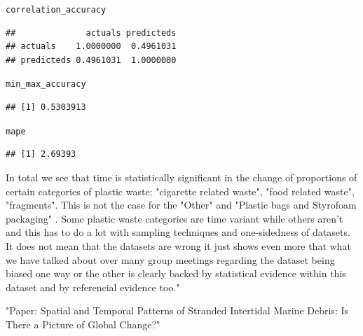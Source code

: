 \documentclass[10pt]{article}\usepackage[]{graphicx}\usepackage[]{color}
\makeatletter
\newcommand{\hlstd}[1]{\textcolor[rgb]{0.345,0.345,0.345}{#1}}%
\newenvironment{kframe}{%
 \def\at@end@of@kframe{}%
 \ifinner\ifhmode%
  \def\at@end@of@kframe{\end{minipage}}%
  \begin{minipage}{\columnwidth}%
 \fi\fi%
 \def\FrameCommand##1{\hskip\@totalleftmargin \hskip-\fboxsep
 \colorbox{shadecolor}{##1}\hskip-\fboxsep
     \hskip-\linewidth \hskip-\@totalleftmargin \hskip\columnwidth}%
 \MakeFramed {\advance\hsize-\width
   \@totalleftmargin\z@ \linewidth\hsize
   \@setminipage}}%
 {\par\unskip\endMakeFramed%
 \at@end@of@kframe}
\newenvironment{knitrout}{}{} %
\makeatother
\begin{document}
\begin{knitrout}
\begin{kframe}
\begin{alltt}
\hlstd{correlation_accuracy}
\end{alltt}
\begin{verbatim}
##              actuals predicteds
## actuals    1.0000000  0.4961031
## predicteds 0.4961031  1.0000000
\end{verbatim}
\begin{alltt}
\hlstd{min_max_accuracy}
\end{alltt}
\begin{verbatim}
## [1] 0.5303913
\end{verbatim}
\begin{alltt}
\hlstd{mape}
\end{alltt}
\begin{verbatim}
## [1] 2.69393
\end{verbatim}
\end{kframe}
\end{knitrout}

In total we see that time is statistically significant in the change of proportions of certain categories
of plastic waste: "cigarette related waste", "food related waste", "fragments". This is not the case for the "Other" and "Plastic bags and Styrofoam packaging" .
Some plastic waste categories are time variant while others aren't and this has to do a  lot with sampling techniques and one-sidedness of datasets. It does not mean that the datasets are wrong it just shows even more that what we have talked about over many group meetings regarding the dataset being biased one way or the other is clearly backed by statistical evidence within this dataset and by referencial evidence too."

"Paper: Spatial and Temporal Patterns of Stranded Intertidal Marine Debris:
Is There a Picture of Global Change?"
\end{document}
